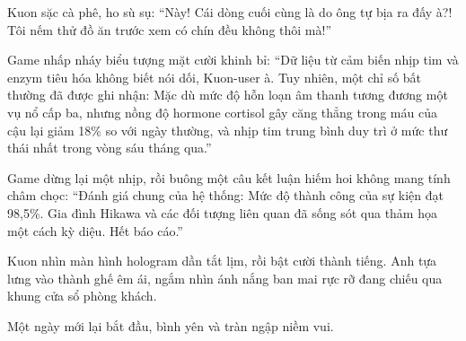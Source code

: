 \documentclass[../main.tex]{subfiles}
\begin{document}
Kuon sặc cà phê, ho sù sụ: ``Này! Cái dòng cuối cùng là do ông tự bịa ra đấy à?! Tôi nếm thử đồ ăn trước xem có chín đều không thôi mà!''

Game nhấp nháy biểu tượng mặt cười khinh bỉ: ``Dữ liệu từ cảm biến nhịp tim và enzym tiêu hóa không biết nói dối, Kuon-user à. Tuy nhiên, một chỉ số bất thường đã được ghi nhận: Mặc dù mức độ hỗn loạn âm thanh tương đương một vụ nổ cấp ba, nhưng nồng độ hormone cortisol gây căng thẳng trong máu của cậu lại giảm 18\% so với ngày thường, và nhịp tim trung bình duy trì ở mức thư thái nhất trong vòng sáu tháng qua.''

Game dừng lại một nhịp, rồi buông một câu kết luận hiếm hoi không mang tính châm chọc: ``Đánh giá chung của hệ thống: Mức độ thành công của sự kiện đạt 98,5\%. Gia đình Hikawa và các đối tượng liên quan đã sống sót qua thảm họa một cách kỳ diệu. Hết báo cáo.''

Kuon nhìn màn hình hologram dần tắt lịm, rồi bật cười thành tiếng. Anh tựa lưng vào thành ghế êm ái, ngắm nhìn ánh nắng ban mai rực rỡ đang chiếu qua khung cửa sổ phòng khách.

Một ngày mới lại bắt đầu, bình yên và tràn ngập niềm vui.
\end{document}
